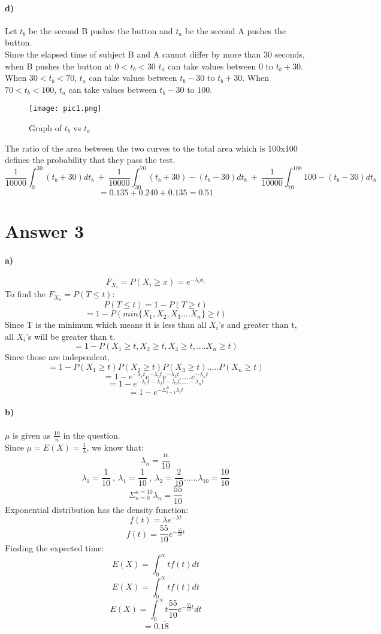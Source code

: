 \documentclass[12pt]{article}
\begin{document}
\paragraph{d)}
Let $t_b$ be the second B pushes the button and $t_a$ be the second A pushes the button.\\
Since the elapsed time of subject B and A cannot differ by more than 30 seconds, when B pushes the button at $0<t_b<30$ $t_a$ can take values between 0 to $t_b+30$. When $30<t_b<70$, $t_a$ can take values between $t_b-30$ to $t_b+30$. When $70<t_b<100$, $t_a$ can take values between $t_b-30$ to $100$.
\begin{center}
        \begin{figure}[H]
        \hspace{40mm}\texttt{[image: pic1.png]}
        \caption{Graph of $t_b$ vs $t_a$}
        \label{fig:htgraph}
    \end{figure}
\end{center}
The ratio of the area between the two curves to the total area which is 100x100 defines the probability that they pass the test. \\
\[\frac{1}{10000}\int_{0}^{30}(t_b+30)dt_b \ + \  \frac{1}{10000}\int_{30}^{70}(t_b+30)-(t_b-30)dt_b \ + \ \frac{1}{10000}\int_{70}^{100}100-(t_b-30)dt_b \]
\[=0.135+0.240+0.135=0.51\]
\section*{Answer 3}
\paragraph{a)}
\[F_{X_i}=P(X_i \geq x)=e^{-\lambda_ix_i}\]
To find the $F_{X_n}=P(T \leq t)$:
\[P(T \leq t)=1-P(T \geq t)\]
\[=1-P(min\{X_1,X_2,X_3....X_n \} \geq t)\]
Since T is the minimum which means it is less than all $X_i$'s and greater than t, all $X_i$'s will be greater than t. 
\[=1-P(X_1\geq t,X_2 \geq t,X_3 \geq t,....X_n \geq t)\]
Since those are independent,
\[=1-P(X_1 \geq t)P(X_2 \geq t)P(X_3 \geq t).....P(X_n \geq t)\]
\[=1-e^{-\lambda_1 t}e^{-\lambda_2 t}e^{-\lambda_3 t}.....e^{-\lambda_n t}\]
\[=1-e^{-\lambda_1t-\lambda_2t-\lambda_3t.....-\lambda_n t}\]
\[=1-e^{-\Sigma_{i=1}^{n}\lambda_i t}\]

\paragraph{b)}
$\mu$ is given as $\frac{10}{n}$ in the question.\\
Since $\mu=E(X)=\frac{1}{\lambda}$, we know that:
\[\lambda_n=\frac{n}{10}\]
\[\lambda_1=\frac{1}{10} \ ,\ \lambda_1=\frac{1}{10} \ ,\ \lambda_2=\frac{2}{10}......\lambda_10=\frac{10}{10} \]
\[\Sigma_{n=0}^{n=10}\lambda_n=\frac{55}{10}\]
Exponential distribution has the density function:
\[f(t)=\lambda e^{-\lambda t}\]
\[f(t)=\frac{55}{10}e^{-\frac{55}{10} t}\]
Finding the expected time:
\[E(X)=\int_{0}^{\propto}tf(t)dt\]
\[E(X)=\int_{0}^{\propto}tf(t)dt\]
\[E(X)=\int_{0}^{\propto}t\frac{55}{10}e^{-\frac{55}{10} t}dt\]
\[=0.\overline{18}\]
\end{document}
